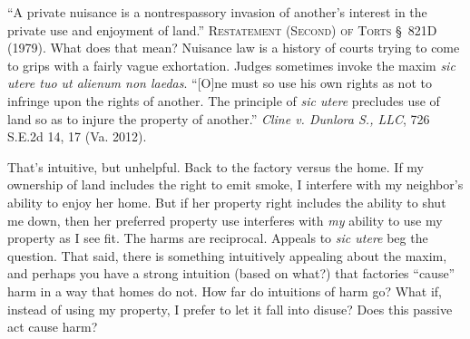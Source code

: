 ``A private nuisance is a nontrespassory invasion of another's interest in the
private use and enjoyment of land.'' \textsc{Restatement (Second) of Torts}
\S~821D (1979). What does that mean? Nuisance law is a history of courts trying
to come to grips with a fairly vague exhortation. Judges sometimes invoke the
maxim \textit{sic utere tuo ut alienum non laedas}. ``[O]ne must so use his own
rights as not to infringe upon the rights of another. The principle of
\textit{sic utere} precludes use of land so as to injure the property of
another.'' \emph{Cline v. Dunlora S., LLC}, 726 S.E.2d 14, 17 (Va. 2012). 

That's intuitive, but unhelpful. Back to the factory versus the home. If my
ownership of land includes the right to emit smoke, I interfere with my
neighbor's ability to enjoy her home. But if her property right includes the
ability to shut me down, then her preferred property use interferes with
\textit{my} ability to use my property as I see fit. The harms are reciprocal.
Appeals to \textit{sic utere} beg the question. That said, there is something
intuitively appealing about the maxim, and perhaps you have a strong intuition
(based on what?) that factories ``cause'' harm in a way that homes do not. How
far do intuitions of harm go? What if, instead of using my property, I prefer to
let it fall into disuse? Does this passive act cause harm? 

